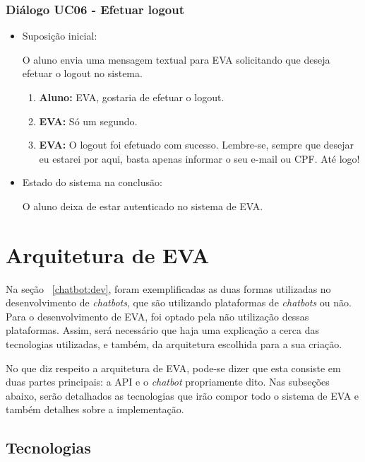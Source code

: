 \subsubsection{Diálogo UC06 - Efetuar logout}

\begin{itemize}
    \item Suposição inicial:
    
        O aluno envia uma mensagem textual para EVA solicitando que deseja efetuar o logout no sistema.
        
        \begin{enumerate}
            \item \textbf{Aluno:} EVA, gostaria de efetuar o logout.
            \item \textbf{EVA:} Só um segundo.
            \item \textbf{EVA:} O logout foi efetuado com sucesso. Lembre-se, sempre que desejar eu estarei por aqui, basta apenas informar o seu e-mail ou CPF. Até logo!
        \end{enumerate}
    
    \item Estado do sistema na conclusão:
    
        O aluno deixa de estar autenticado no sistema de EVA.
\end{itemize}


\section{Arquitetura de EVA}

Na seção ~\ref{chatbot:dev}, foram exemplificadas as duas formas utilizadas no desenvolvimento de \textit{chatbots}, que são utilizando plataformas de \textit{chatbots} ou não. Para o desenvolvimento de EVA, foi optado pela não utilização dessas plataformas. Assim, será necessário que haja uma explicação a cerca das tecnologias utilizadas, e também, da arquitetura escolhida para a sua criação.

No que diz respeito a arquitetura de EVA, pode-se dizer que esta consiste em duas partes principais: a API e o \textit{chatbot} propriamente dito. Nas subseções abaixo, serão detalhados as tecnologias que irão compor todo o sistema de EVA e também detalhes sobre a implementação.

\subsection{Tecnologias}


